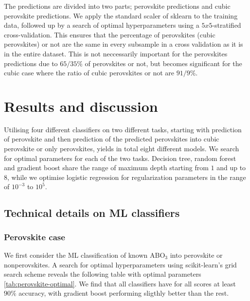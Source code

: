 

The predictions are divided into two parts; perovskite predictions and cubic perovskite predictions. We apply the standard scaler of sklearn \cite{Pedregosa2012} to the training data, followed up by a search of optimal hyperparameters using a $5x5$-stratified cross-validation. This ensures that the percentage of perovskites (cubic perovskites) or not are the same in every subsample in a cross validation as it is in the entire dataset. This is not neccessarily important for the perovskites predictions due to $65/35 \%$ of perovskites or not, but becomes significant for the cubic case where the ratio of cubic perovskites or not are $91/9\%$.

\section{Results and discussion}

Utilising four different classifiers on two different tasks, starting with prediction of perovskite and then prediction of the predicted perovskites into cubic perovskite or only perovskites, yields in total eight different models. We search for optimal parameters for each of the two tasks. Decision tree, random forest and gradient boost share the range of maximum depth starting from $1$ and up to $8$, while we optimise logistic regression for regularization parameters in the range of $10^{-3}$ to $10^5$.

\subsection{Technical details on ML classifiers}

\subsubsection{Perovskite case}
We first consider the ML classification of known ABO$_3$ into perovskite or nonperovskites. A search for optimal hyperparameters using scikit-learn's grid search scheme \cite{Pedregosa2012} reveals the following table with optimal parameters \autoref{tab:perovskite-optimal}. We find that all classifiers have for all scores at least $90\%$ accuracy, with gradient boost performing sligthly better than the rest.

